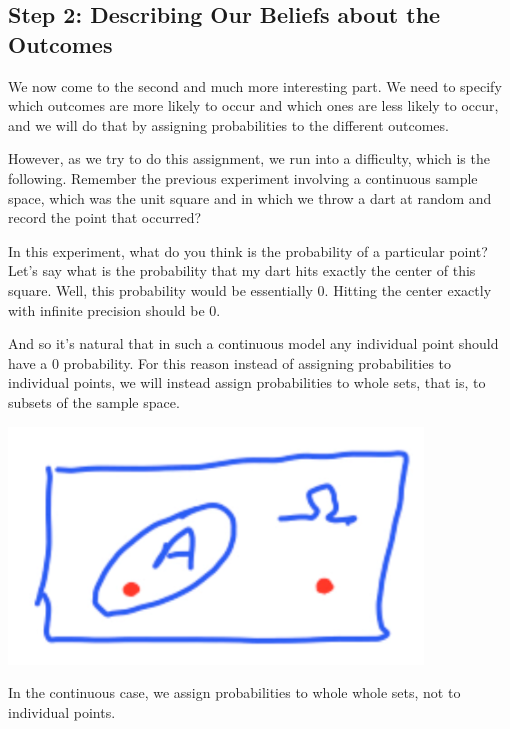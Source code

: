 \documentclass{tufte-handout}
\begin{document}
\vspace{0.5cm}



\subsection{Step 2: Describing Our Beliefs about the Outcomes}\label{sec:probability-space}

We now come to the second and much more interesting part. We need to specify which outcomes are
more likely to occur and which ones are less likely to occur, and we will do that by assigning
probabilities to the different outcomes.

However, as we try to do this assignment, we run into a difficulty, which is the following.
Remember the previous experiment involving a continuous sample space, which was the unit square
and in which we throw a dart at random and record the point that occurred?

In this experiment, what do you think is the probability of a particular point? Let's say what is the
probability that my dart hits exactly the center of this square. Well, this probability would be essentially
$0$. Hitting the center exactly with infinite precision should be $0$.

And so it's natural that in such a continuous model any individual point should have a $0$ probability. For
this reason instead of assigning probabilities to individual points, we will instead assign probabilities to
whole sets, that is, to subsets of the sample space.

\begin{marginfigure}
  \includegraphics[width=\linewidth]{Subset}
  \caption{In the continuous case, we assign probabilities to whole whole sets, not to individual points.}
\end{marginfigure}
\end{document}
